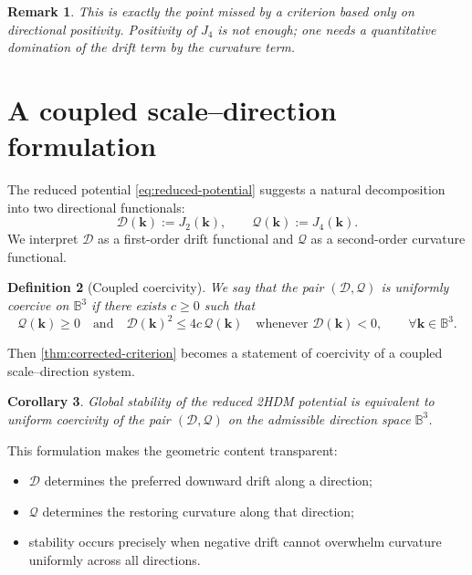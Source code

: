 \documentclass[11pt,a4paper]{article}
\newtheorem{definition}{Definition}[section]
\newtheorem{corollary}[definition]{Corollary}
\newtheorem{remark}[definition]{Remark}
\newcommand{\kk}{\bm{k}}
\newcommand{\cD}{\mathcal{D}} %
\newcommand{\cQ}{\mathcal{Q}}
\newcommand{\Sphere}{\mathbb{B}^3}
\begin{document}
	\begin{remark}
		This is exactly the point missed by a criterion based only on directional positivity. Positivity of \(J_4\) is not enough; one needs a quantitative domination of the drift term by the curvature term.
	\end{remark}
	
	\section{A coupled scale--direction formulation}
	
	The reduced potential \eqref{eq:reduced-potential} suggests a natural decomposition into two directional functionals:
	\[
	\cD(\kk):=J_2(\kk),\qquad \cQ(\kk):=J_4(\kk).
	\]
	We interpret \(\cD\) as a first-order drift functional and \(\cQ\) as a second-order curvature functional.
	
	\begin{definition}[Coupled coercivity]
		We say that the pair \((\cD,\cQ)\) is \emph{uniformly coercive on \(\Sphere\)} if there exists \(c\ge 0\) such that
		\begin{equation}\label{eq:uniform-coercivity}
			\cQ(\kk)\ge 0
			\quad\text{and}\quad
			\cD(\kk)^2\le 4c\,\cQ(\kk)
			\quad\text{whenever }\cD(\kk)<0,
			\qquad \forall \kk\in\Sphere.
		\end{equation}
	\end{definition}
	
	Then \cref{thm:corrected-criterion} becomes a statement of coercivity of a coupled scale--direction system.
	
	\begin{corollary}\label{cor:coercive-formulation}
		Global stability of the reduced 2HDM potential is equivalent to uniform coercivity of the pair \((\cD,\cQ)\) on the admissible direction space \(\Sphere\).
	\end{corollary}
	
	This formulation makes the geometric content transparent:
	\begin{itemize}
		\item \(\cD\) determines the preferred downward drift along a direction;
		\item \(\cQ\) determines the restoring curvature along that direction;
		\item stability occurs precisely when negative drift cannot overwhelm curvature uniformly across all directions.
	\end{itemize}
	
\end{document}
